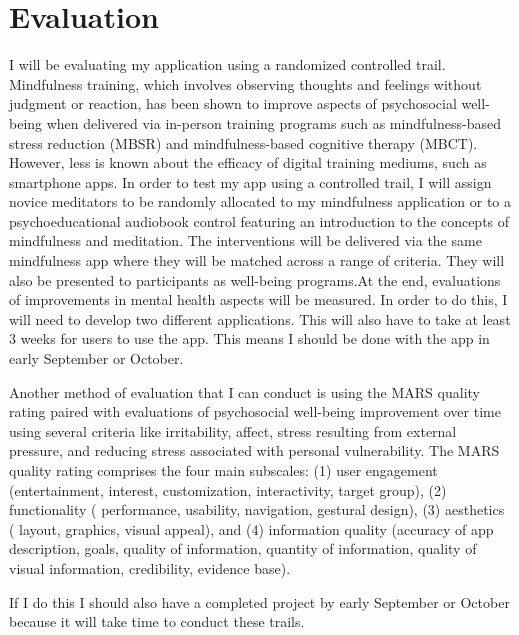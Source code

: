\documentclass[10pt,twocolumn]{article}
\begin{document}
\section{Evaluation}
I will be evaluating my application using a randomized controlled trail. Mindfulness training, which involves observing thoughts and feelings without judgment or reaction, has been shown to improve aspects of psychosocial well-being when delivered via in-person training programs such as mindfulness-based stress reduction (MBSR) and mindfulness-based cognitive therapy (MBCT). However, less is known about the efficacy of digital training mediums, such as smartphone apps. In order to test my app using a controlled trail, I will assign novice meditators to be randomly allocated to my mindfulness  application or to a psychoeducational audiobook control featuring an introduction to the concepts of mindfulness and meditation. The interventions will be delivered via the same mindfulness app where they will be matched across a range of criteria. They will also be presented to participants as well-being programs.At the end, evaluations of improvements in mental health aspects will be measured. In order to do this, I will need to develop two different applications. This will also have to take at least 3 weeks for users to use the app. This means I should be done with the app in early September or October.

Another method of evaluation that I can conduct is using the MARS quality rating paired with evaluations of psychosocial well-being improvement over time using several criteria like irritability, affect, stress resulting from external pressure, and reducing stress associated with personal vulnerability. The MARS quality rating comprises the four main subscales: (1) user engagement (entertainment, interest, customization, interactivity, target group), (2) functionality ( performance, usability, navigation, gestural design), (3) aesthetics ( layout, graphics, visual appeal), and (4) information quality (accuracy of app description, goals, quality of information, quantity of information, quality of visual information, credibility, evidence base).

If I do this I should also have a completed project by early September or October because it will take time to conduct these trails. 

\printbibliography 
\end{document}
